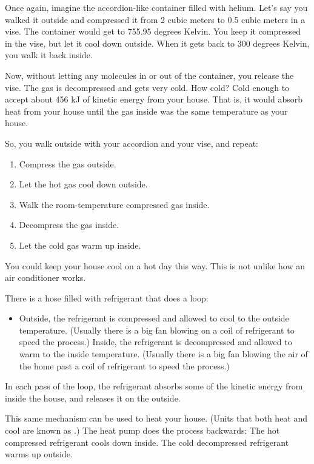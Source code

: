 Once again, imagine the accordion-like container filled with helium.  Let's say you walked it outside and compressed it from 2 cubic meters to 0.5 cubic meters in a vise.  The container would get to 755.95 degrees Kelvin.  You keep it compressed in the vise,  but let it cool down outside.  When it gets back to 300 degrees Kelvin,  you walk it back inside.

Now,  without letting any molecules in or out of the container,  you release the vise.  The gas is decompressed and gets very cold. How cold?  Cold enough to accept about 456 kJ of kinetic energy from your house.  That is,  it would absorb heat from your house until the gas inside was the same temperature as your house.

So, you walk outside with your accordion and your vise, and repeat:
\begin{enumerate}
\item Compress the gas outside.
\item Let the hot gas cool down outside.
\item Walk the room-temperature compressed gas inside.
\item Decompress the gas inside.
\item Let the cold gas warm up inside.
\end{enumerate}

You could keep your house cool on a hot day this way.  This is not unlike how an air conditioner works.

There is a hose filled with refrigerant that does a loop:  
\begin{itemize}
\item Outside,  the refrigerant is compressed and allowed to cool to the outside temperature.  (Usually there is a big fan blowing on a coil of refrigerant to speed the process.)
Inside,  the refrigerant is decompressed and allowed to warm to the inside temperature.  (Usually there is a big fan blowing the air of the home past a coil of refrigerant to speed the process.)
\end{itemize}

In each pass of the loop,  the refrigerant absorbs some of the kinetic energy from inside the house, and releases it on the outside.

This same mechanism can be used to heat your house.  (Units that both heat and cool are known as .)  
The heat pump does the process backwards:  The hot compressed refrigerant cools down inside.  The cold decompressed refrigerant warms up outside.

